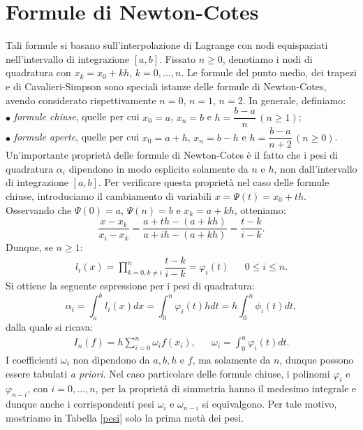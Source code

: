 \documentclass[10pt]{amsart}
\begin{document}
\section{Formule di Newton-Cotes}
Tali formule si basano sull'interpolazione di Lagrange con nodi equispaziati nell'intervallo di integrazione $[a,b]$. Fissato $n \ge 0$, denotiamo i nodi di quadratura con $x_k = x_0 + kh$, $k = 0, \dots, n$. Le formule del punto medio, dei trapezi e di Cavalieri-Simpson sono speciali istanze delle formule di Newton-Cotes, avendo considerato rispettivamente $n = 0$, $n = 1$, $n = 2$. In generale, definiamo:\\
$\bullet$ {\it formule chiuse}, quelle per cui $x_0 = a$, $x_n = b$ e $h = \dfrac{b-a}{n}\,(n \ge 1)$;\\
$\bullet$ {\it formule aperte}, quelle per cui $x_0 = a+h$, $x_n = b-h$ e $h = \dfrac{b-a}{n+2}\,(n \ge 0)$.\\
Un'importante propriet\`a delle formule di Newton-Cotes \`e il fatto che i pesi di quadratura $\alpha_i$ dipendono in modo esplicito solamente da $n$ e $h$, non dall'intervallo di integrazione $[a,b]$. Per verificare questa propriet\`a nel caso delle formule chiuse, introduciamo il cambiamento di variabili $x = \Psi (t) = x_0 + th$. Osservando che $\Psi(0) = a$, $\Psi(n) = b$ e $x_k = a + kh$, otteniamo:
\begin{equation}
\dfrac{x-x_k}{x_i-x_k} = \dfrac{a+th-(a+kh)}{a+ih-(a+kh)} = \dfrac{t-k}{i-k}.
\end{equation}
Dunque, se $n \ge 1$:
\begin{eqnarray}
l_i(x) = \prod_{k = 0,k \ne i}^n \dfrac{t-k}{i-k} = \varphi_i (t) & & 0 \le i \le n.
\end{eqnarray}
Si ottiene la seguente espressione per i pesi di quadratura:
\begin{equation}
\alpha_i = \int_a^b l_i(x)dx = \int_0^n \varphi_i (t) hdt = h\int_0^n \phi_i (t) dt,
\end{equation}
dalla quale si ricava:
\begin{eqnarray}
I_n(f) = h \sum_{i=0}^n \omega_i f(x_i), & & \omega_i = \int_0^n \varphi_i (t) dt. 
\end{eqnarray}
I coefficienti $\omega_i$ non dipendono da $a,b,h$ e $f$, ma solamente da $n$, dunque possono essere tabulati {\it a priori}. Nel caso particolare delle formule chiuse, i polinomi $\varphi_i$ e $\varphi_{n-i}$, con $i = 0, \dots, n$, per la propriet\`a di simmetria hanno il medesimo integrale e dunque anche i corrispondenti pesi $\omega_i$ e $\omega_{n-i}$ si equivalgono. Per tale motivo, mostriamo in Tabella \ref{pesi} solo la prima met\`a dei pesi.
\end{document}
